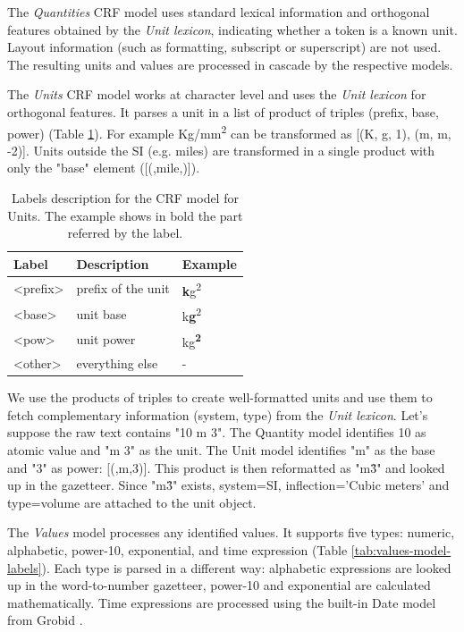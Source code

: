\documentclass[sigconf]{acmart}
\begin{document}
The \textit{Quantities} CRF model uses standard lexical information and orthogonal features obtained by the \textit{Unit lexicon}, indicating  whether a token is a known unit. Layout information (such as formatting, subscript or superscript) are not used. The resulting units and values are processed in cascade by the respective models. 

The \textit{Units} CRF model works at character level and uses the \textit{Unit lexicon} for orthogonal features. It parses a unit in a list of product of triples (prefix, base, power) (Table \ref{tab:units-model-labels}). For example Kg/mm\textsuperscript{2} can be transformed as [(K, g, 1), (m, m, -2)]. Units outside the SI (e.g. miles) are transformed in a single product with only the "base" element ([(,mile,)]). 

\begin{table}[ht]
  \caption{Labels description for the CRF model for Units. The example shows in bold the part referred by the label. }
  \label{tab:units-model-labels}
  \begin{tabular}{lll}
    \toprule
    Label & Description & Example\\
    \midrule
    <prefix> & prefix of the unit  & \textbf{k}g\textsuperscript{2} \\
    <base> & unit base & k\textbf{g}\textsuperscript{2}\\
    <pow> & unit power & kg\textsuperscript{\textbf{2}}\\
    <other> & everything else & - \\
  \bottomrule
\end{tabular}
\end{table}

We use the products of triples to create well-formatted units and use them to fetch complementary information (system, type) from the \textit{Unit lexicon}. Let's suppose the raw text contains "10 m 3". The Quantity model identifies 10 as atomic value and "m 3" as the unit. The Unit model identifies "m" as the base and "3" as power: [(,m,3)]. This product is then reformatted as "m\^3" and looked up in the gazetteer. Since "m\^3" exists, system=SI, inflection='Cubic meters' and type=volume are attached to the unit object. 

The \textit{Values} model processes any identified values. It supports five types: numeric, alphabetic, power-10, exponential, and time expression (Table \ref{tab:values-model-labels}). Each type is parsed in a different way: alphabetic expressions are looked up in the word-to-number gazetteer, power-10 and exponential are calculated mathematically. Time expressions are processed using the built-in Date model from Grobid \cite{GROBID}.
\end{document}
